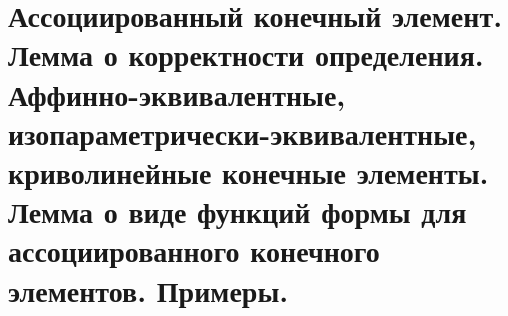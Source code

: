 \documentclass[__main__.tex]{subfiles}
\begin{document}
\section{Ассоциированный конечный элемент. Лемма о корректности определения. Аффинно-эквивалентные, изопараметрически-эквивалентные, криволинейные конечные элементы. Лемма о виде функций формы для ассоциированного конечного элементов. Примеры.}
\end{document}
